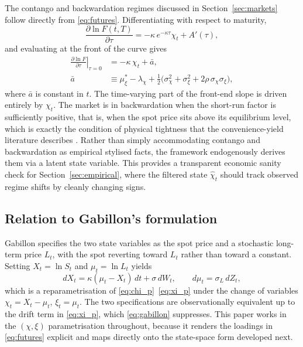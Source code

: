 \documentclass[journal]{IEEEtran}
\begin{document}
The contango and backwardation regimes discussed in Section~\ref{sec:markets} follow directly from \eqref{eq:futures}. Differentiating with respect to maturity,
%
\begin{equation}
  \frac{\partial \ln F(t,T)}{\partial \tau}
    = -\kappa\, e^{-\kappa\tau}\chi_t + A'(\tau) ,
  \label{eq:slope}
\end{equation}
%
and evaluating at the front of the curve gives
%
\begin{equation}
  \begin{aligned}
    \left.\frac{\partial \ln F}{\partial \tau}\right|_{\tau=0}
      &= -\kappa\,\chi_t + \bar{a} , \\[2pt]
    \bar{a} &\equiv \mu_\xi^{*} - \lambda_\chi
      + \tfrac{1}{2}\bigl(\sigma_\chi^{2} + \sigma_\xi^{2}
        + 2\rho\,\sigma_\chi\sigma_\xi\bigr) ,
  \end{aligned}
  \label{eq:frontslope}
\end{equation}
%
where $\bar{a}$ is constant in $t$. The time-varying part of the front-end slope is driven entirely by $\chi_t$. The market is in backwardation when the short-run factor is sufficiently positive, that is, when the spot price sits above its equilibrium level, which is exactly the condition of physical tightness that the convenience-yield literature describes \cite{GibsonSchwartz1990, KilianMurphy2014}. Rather than simply accommodating contango and backwardation as empirical stylised facts, the framework endogenously derives them via a latent state variable. This provides a transparent economic sanity check for Section~\ref{sec:empirical}, where the filtered state $\hat{\chi}_t$ should track observed regime shifts by cleanly changing signs.

\subsection{Relation to Gabillon's formulation}
\label{sec:gabillon-relation}

Gabillon \cite{Gabillon1992} specifies the two state variables as the spot price and a stochastic long-term price $L_t$, with the spot reverting toward $L_t$ rather than toward a constant. Setting $X_t = \ln S_t$ and $\mu_t = \ln L_t$ yields
%
\begin{equation}
  dX_t = \kappa(\mu_t - X_t)\,dt + \sigma\,dW_t ,
  \qquad
  d\mu_t = \sigma_L\,dZ_t ,
  \label{eq:gabillon}
\end{equation}
%
which is a reparametrisation of \eqref{eq:chi_p}~\eqref{eq:xi_p} under the change of variables $\chi_t = X_t - \mu_t$, $\xi_t = \mu_t$. The two specifications are observationally equivalent up to the drift term in \eqref{eq:xi_p}, which \eqref{eq:gabillon} suppresses. This paper works in the $(\chi, \xi)$ parametrisation throughout, because it renders the loadings in \eqref{eq:futures} explicit and maps directly onto the state-space form developed next.
\end{document}
